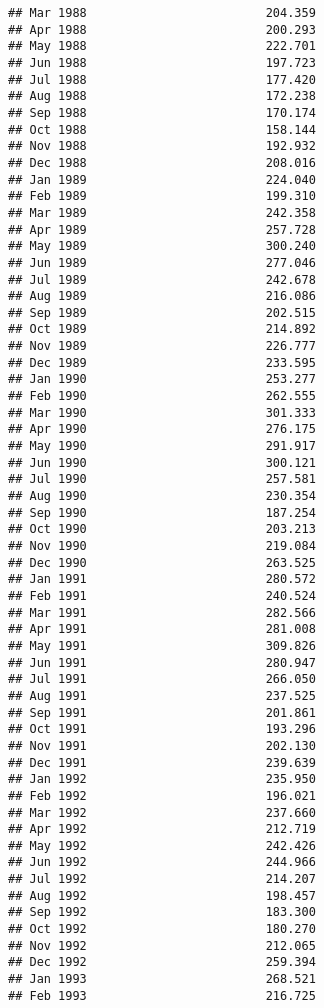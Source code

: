 \documentclass[
]{article}
\begin{document}
\begin{verbatim}
## Mar 1988                         204.359
## Apr 1988                         200.293
## May 1988                         222.701
## Jun 1988                         197.723
## Jul 1988                         177.420
## Aug 1988                         172.238
## Sep 1988                         170.174
## Oct 1988                         158.144
## Nov 1988                         192.932
## Dec 1988                         208.016
## Jan 1989                         224.040
## Feb 1989                         199.310
## Mar 1989                         242.358
## Apr 1989                         257.728
## May 1989                         300.240
## Jun 1989                         277.046
## Jul 1989                         242.678
## Aug 1989                         216.086
## Sep 1989                         202.515
## Oct 1989                         214.892
## Nov 1989                         226.777
## Dec 1989                         233.595
## Jan 1990                         253.277
## Feb 1990                         262.555
## Mar 1990                         301.333
## Apr 1990                         276.175
## May 1990                         291.917
## Jun 1990                         300.121
## Jul 1990                         257.581
## Aug 1990                         230.354
## Sep 1990                         187.254
## Oct 1990                         203.213
## Nov 1990                         219.084
## Dec 1990                         263.525
## Jan 1991                         280.572
## Feb 1991                         240.524
## Mar 1991                         282.566
## Apr 1991                         281.008
## May 1991                         309.826
## Jun 1991                         280.947
## Jul 1991                         266.050
## Aug 1991                         237.525
## Sep 1991                         201.861
## Oct 1991                         193.296
## Nov 1991                         202.130
## Dec 1991                         239.639
## Jan 1992                         235.950
## Feb 1992                         196.021
## Mar 1992                         237.660
## Apr 1992                         212.719
## May 1992                         242.426
## Jun 1992                         244.966
## Jul 1992                         214.207
## Aug 1992                         198.457
## Sep 1992                         183.300
## Oct 1992                         180.270
## Nov 1992                         212.065
## Dec 1992                         259.394
## Jan 1993                         268.521
## Feb 1993                         216.725

\end{verbatim}
\end{document}
